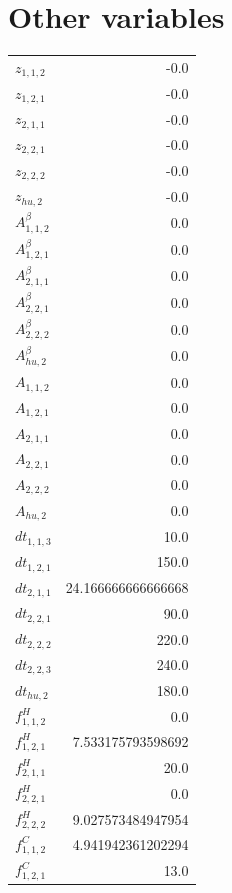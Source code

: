 \documentclass{article}%
\makeatletter
\let\mcnewpage=\newpage%
\newcommand{\TrickSupertabularIntoMulticols}{%
\renewcommand\newpage{%
\if@firstcolumn%
\hrule width\linewidth height0pt%
\columnbreak%
\else%
\mcnewpage%
\fi%
}%
}%
\makeatother
\begin{document}
\section{Other variables}%
\thispagestyle{plain}%
\begin{multicols*}{3}%
\TrickSupertabularIntoMulticols%
%
\begin{supertabular}{lr}%
	$z_{1,1,2}$ & -0.0 \\%
	$z_{1,2,1}$ & -0.0 \\%
	$z_{2,1,1}$ & -0.0 \\%
	$z_{2,2,1}$ & -0.0 \\%
	$z_{2,2,2}$ & -0.0 \\%
	$z_{hu,2}$ & -0.0 \\%
	$A_{1,1,2}^{\beta}$ & 0.0 \\%
	$A_{1,2,1}^{\beta}$ & 0.0 \\%
	$A_{2,1,1}^{\beta}$ & 0.0 \\%
	$A_{2,2,1}^{\beta}$ & 0.0 \\%
	$A_{2,2,2}^{\beta}$ & 0.0 \\%
	$A_{hu,2}^{\beta}$ & 0.0 \\%
	$A_{1,1,2}$ & 0.0 \\%
	$A_{1,2,1}$ & 0.0 \\%
	$A_{2,1,1}$ & 0.0 \\%
	$A_{2,2,1}$ & 0.0 \\%
	$A_{2,2,2}$ & 0.0 \\%
	$A_{hu,2}$ & 0.0 \\%
	$dt_{1,1,3}$ & 10.0 \\%
	$dt_{1,2,1}$ & 150.0 \\%
	$dt_{2,1,1}$ & 24.166666666666668 \\%
	$dt_{2,2,1}$ & 90.0 \\%
	$dt_{2,2,2}$ & 220.0 \\%
	$dt_{2,2,3}$ & 240.0 \\%
	$dt_{hu,2}$ & 180.0 \\%
	$f_{1,1,2}^{H}$ & 0.0 \\%
	$f_{1,2,1}^{H}$ & 7.533175793598692 \\%
	$f_{2,1,1}^{H}$ & 20.0 \\%
	$f_{2,2,1}^{H}$ & 0.0 \\%
	$f_{2,2,2}^{H}$ & 9.027573484947954 \\%
	$f_{1,1,2}^{C}$ & 4.941942361202294 \\%
	$f_{1,2,1}^{C}$ & 13.0 \\%

\end{supertabular}
\end{multicols*}
\end{document}
